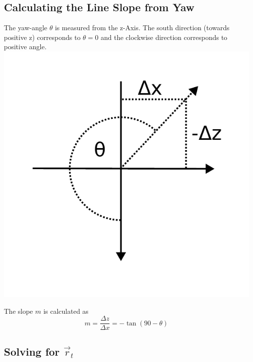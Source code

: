\documentclass[a4paper,10pt]{article}
\begin{document}
\begin{multicols}{2}
    \subsection{Calculating the Line Slope from Yaw}

    The yaw-angle $\theta$ is measured from the z-Axis.
    The south direction (towards positive z) corresponds to $\theta = 0$ and the clockwise direction corresponds to positive angle.
    \includegraphics[width = \linewidth]{img/theta.pdf}

    The slope $m$ is calculated as
    \begin{equation}
        m = \frac{\Delta z}{\Delta x} = -\tan(90-\theta)
    \end{equation}

    \subsection{Solving for $\vec r_t$}


\end{multicols}
\end{document}
